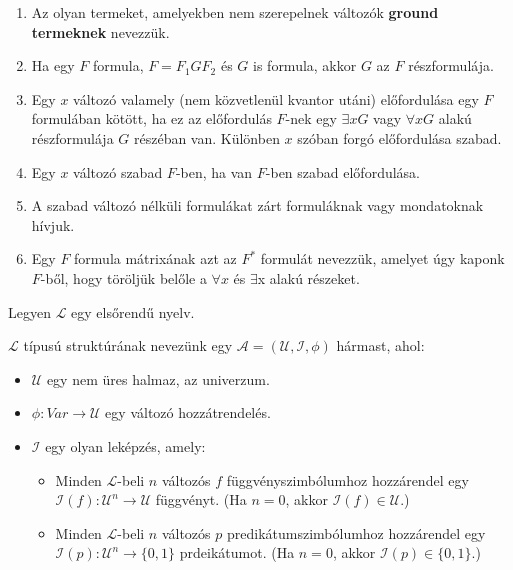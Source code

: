 \begin{frame}

\begin{tcolorbox}[title={Kötött, szabad változó, nyílt, zárt formula}]
\begin{enumerate}
\item Az olyan termeket, amelyekben nem szerepelnek változók \textbf{ground termeknek} nevezzük.
\item Ha egy $F$ formula, $F = F_1GF_2$ és $G$ is formula, akkor $G$ az $F$ részformulája.
\item Egy $x$ változó valamely (nem közvetlenül kvantor utáni) előfordulása egy $F$ formulában kötött, ha ez az előfordulás $F$-nek egy ${\exists}xG$ vagy ${\forall}xG$ alakú részformulája $G$ részéban van. Különben $x$ szóban forgó előfordulása szabad.
\item Egy $x$ változó szabad $F$-ben, ha van $F$-ben szabad előfordulása.
\item A szabad változó nélküli formulákat zárt formuláknak vagy mondatoknak hívjuk.
\item Egy $F$ formula mátrixának azt az $F^*$ formulát nevezzük, amelyet úgy kaponk $F$-ből, hogy töröljük belőle a ${\forall}x$ és ${\exists}$x alakú részeket.
\end{enumerate}
\end{tcolorbox}

\begin{tcolorbox}[title={Az elsőrendű nyelv szemantikája}]
Legyen $\mathcal{L}$ egy elsőrendű nyelv.\\
\mmedskip

$\mathcal{L}$ típusú struktúrának nevezünk egy $\mathcal{A} = (\mathcal{U}, \mathcal{I}, {\phi})$ hármast, ahol:\\
\mmedskip

\begin{itemize}
\item $\mathcal{U}$ egy nem üres halmaz, az univerzum.
\item ${\phi} : Var \rightarrow \mathcal{U}$ egy változó hozzátrendelés.
\item $\mathcal{I}$ egy olyan leképzés, amely:
\begin{itemize}
\item Minden $\mathcal{L}$-beli $n$ változós $f$ függvényszimbólumhoz hozzárendel egy $\mathcal{I}(f) : \mathcal{U}^n \rightarrow \mathcal{U}$ függvényt. (Ha $n = 0$, akkor $\mathcal{I}(f) \in \mathcal{U}$.)
\item Minden $\mathcal{L}$-beli $n$ változós $p$ predikátumszimbólumhoz hozzárendel egy $\mathcal{I}(p) : \mathcal{U}^n \rightarrow \{0, 1\}$ prdeikátumot. (Ha $n = 0$, akkor $\mathcal{I}(p) \in \{0, 1\}$.)
\end{itemize}
\end{itemize}

\end{tcolorbox}

\end{frame}

